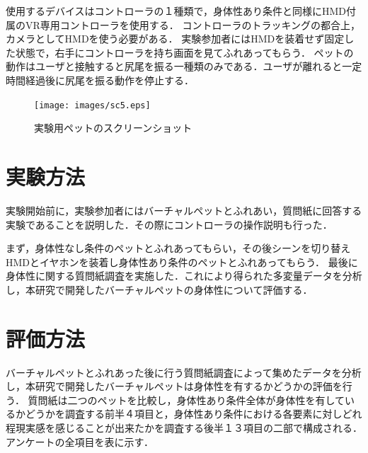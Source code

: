 使用するデバイスはコントローラの１種類で，身体性あり条件と同様にHMD付属のVR専用コントローラを使用する．
コントローラのトラッキングの都合上，カメラとしてHMDを使う必要がある．
実験参加者にはHMDを装着せず固定した状態で，右手にコントローラを持ち画面を見てふれあってもらう．
ペットの動作はユーザと接触すると尻尾を振る一種類のみである．ユーザが離れると一定時間経過後に尻尾を振る動作を停止する．

\begin{figure}[H]
\centering
\texttt{[image: images/sc5.eps]}
\caption{実験用ペットのスクリーンショット}
\label{fig:sc1}
\end{figure} 

\section{実験方法}
実験開始前に，実験参加者にはバーチャルペットとふれあい，質問紙に回答する実験であることを説明した．その際にコントローラの操作説明も行った．

まず，身体性なし条件のペットとふれあってもらい，その後シーンを切り替えHMDとイヤホンを装着し身体性あり条件のペットとふれあってもらう．
最後に身体性に関する質問紙調査を実施した．これにより得られた多変量データを分析し，本研究で開発したバーチャルペットの身体性について評価する．

\section{評価方法}

バーチャルペットとふれあった後に行う質問紙調査によって集めたデータを分析し，本研究で開発したバーチャルペットは身体性を有するかどうかの評価を行う．
質問紙は二つのペットを比較し，身体性あり条件全体が身体性を有しているかどうかを調査する前半４項目と，身体性あり条件における各要素に対しどれ程現実感を感じることが出来たかを調査する後半１３項目の二部で構成される．アンケートの全項目を表に示す．

